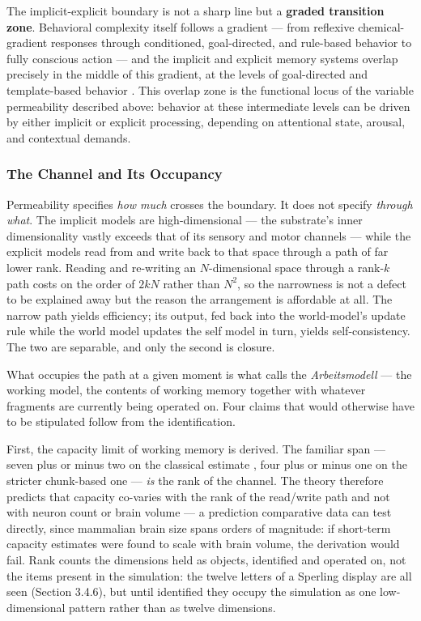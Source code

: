 \documentclass[12pt]{article}
\begin{document}
The implicit-explicit boundary is not a sharp line but a \textbf{graded transition zone}. Behavioral complexity itself follows a gradient --- from reflexive chemical-gradient responses through conditioned, goal-directed, and rule-based behavior to fully conscious action --- and the implicit and explicit memory systems overlap precisely in the middle of this gradient, at the levels of goal-directed and template-based behavior \citep{Gruber2015}. This overlap zone is the functional locus of the variable permeability described above: behavior at these intermediate levels can be driven by either implicit or explicit processing, depending on attentional state, arousal, and contextual demands.


\subsubsection{The Channel and Its Occupancy}

Permeability specifies \emph{how much} crosses the boundary. It does not specify \emph{through what}. The implicit models are high-dimensional --- the substrate's inner dimensionality vastly exceeds that of its sensory and motor channels \citep{Stringer2019HighDim,ZhengMeister2025Slowness} --- while the explicit models read from and write back to that space through a path of far lower rank. Reading and re-writing an $N$-dimensional space through a rank-$k$ path costs on the order of $2kN$ rather than $N^2$, so the narrowness is not a defect to be explained away but the reason the arrangement is affordable at all. The narrow path yields efficiency; its output, fed back into the world-model's update rule while the world model updates the self model in turn, yields self-consistency. The two are separable, and only the second is closure.

What occupies the path at a given moment is what \citet{Gruber2015} calls the \emph{Arbeitsmodell} --- the working model, the contents of working memory together with whatever fragments are currently being operated on. Four claims that would otherwise have to be stipulated follow from the identification.

First, the capacity limit of working memory is derived. The familiar span --- seven plus or minus two on the classical estimate \citep{Miller1956}, four plus or minus one on the stricter chunk-based one \citep{Cowan2001} --- \emph{is} the rank of the channel. The theory therefore predicts that capacity co-varies with the rank of the read/write path and not with neuron count or brain volume — a prediction comparative data can test directly, since mammalian brain size spans orders of magnitude: if short-term capacity estimates were found to scale with brain volume, the derivation would fail. Rank counts the dimensions held as objects, identified and operated on, not the items present in the simulation: the twelve letters of a Sperling display are all seen (Section 3.4.6), but until identified they occupy the simulation as one low-dimensional pattern rather than as twelve dimensions.
\end{document}
